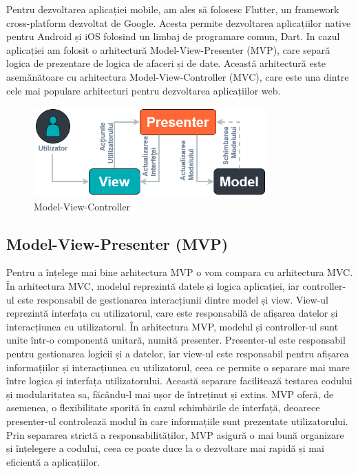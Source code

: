 Pentru dezvoltarea aplicației mobile, am ales să folosesc Flutter, un framework cross-platform dezvoltat de Google. Acesta permite dezvoltarea aplicațiilor native pentru Android și iOS folosind un limbaj de programare comun, Dart. In cazul aplicației am folosit o arhitectură Model-View-Presenter (MVP), care separă logica de prezentare de logica de afaceri și de date. Această arhitectură este asemănătoare cu arhitectura Model-View-Controller (MVC), care este una dintre cele mai populare arhitecturi pentru dezvoltarea aplicațiilor web. 

\begin{figure}[ht]
    \centering
    \includegraphics[width=0.8\textwidth] {images/mvc.png}
    \caption{Model-View-Controller{\cite{mvc}}}
    \label{fig:mvc}
\end{figure}

\subsection{Model-View-Presenter (MVP)}

Pentru a înțelege mai bine arhitectura MVP o vom compara cu arhitectura MVC. În arhitectura MVC, modelul reprezintă datele și logica aplicației, iar controller-ul este responsabil de gestionarea interacțiunii dintre model și view. View-ul reprezintă interfața cu utilizatorul, care este responsabilă de afișarea datelor și interacțiunea cu utilizatorul. În arhitectura MVP, modelul și controller-ul sunt unite într-o componentă unitară, numită presenter. Presenter-ul este responsabil pentru gestionarea logicii și a datelor, iar view-ul este responsabil pentru afișarea informațiilor și interacțiunea cu utilizatorul, ceea ce permite o separare mai mare între logica și interfața utilizatorului. Această separare facilitează testarea codului și modularitatea sa, făcându-l mai ușor de întreținut și extins. MVP oferă, de asemenea, o flexibilitate sporită în cazul schimbările de interfață, deoarece presenter-ul controlează modul în care informațiile sunt prezentate utilizatorului. Prin separarea strictă a responsabilităților, MVP asigură o mai bună organizare și înțelegere a codului, ceea ce poate duce la o dezvoltare mai rapidă și mai eficientă a aplicațiilor.

